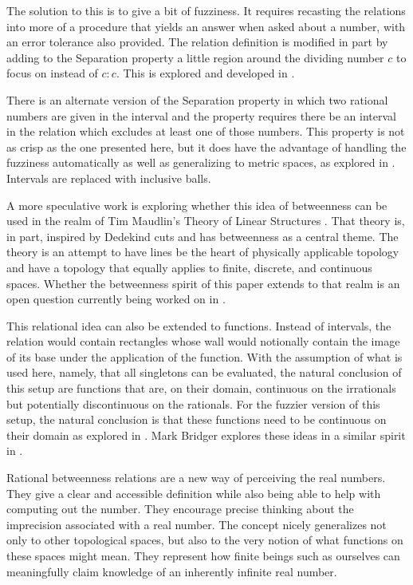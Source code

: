 \documentclass[12pt]{article}
\begin{document}
The solution to this is to give a bit of fuzziness. It requires recasting the relations into more of a procedure that yields an answer when asked about a number, with an error tolerance also provided. The relation definition is modified in part by adding to the Separation property a little region around the dividing number $c$ to focus on instead of $c:c$. This is explored and developed in \cite{taylor24oraclerbr}.

There is an alternate version of the Separation property in which two rational numbers are given in the interval and the property requires there be an interval in the relation which excludes at least one of those numbers. This property is not as crisp as the one presented here, but it does have the advantage of handling the fuzziness automatically as well as generalizing to metric spaces, as explored in \cite{taylor23metric}. Intervals are replaced with inclusive balls. 

A more speculative work is exploring whether this idea of betweenness can be used in the realm of Tim Maudlin's Theory of Linear Structures \cite{maudlin}. That theory is, in part, inspired by Dedekind cuts and has betweenness as a central theme. The theory is an attempt to have lines be the heart of physically applicable topology and have a topology that equally applies to finite, discrete, and continuous spaces. Whether the betweenness spirit of this paper extends to that realm is an open question currently being worked on in \cite{taylor23maudlin}.

This relational idea can also be extended to functions. Instead of intervals, the relation would contain rectangles whose wall would notionally contain the image of its base under the application of the function. With the assumption of what is used here, namely, that all singletons can be evaluated, the natural conclusion of this setup are functions that are, on their domain, continuous on the irrationals but potentially discontinuous on the rationals. For the fuzzier version of this setup, the natural conclusion is that these functions need to be continuous on their domain as explored in \cite{taylor23main}. Mark Bridger explores  these ideas in a similar spirit in \cite{bridger}.

Rational betweenness relations are a new way of perceiving the real numbers. They give a clear and accessible definition while also being able to help with computing out the number. They encourage precise thinking about the imprecision associated with a real number. The concept nicely generalizes not only to other topological spaces, but also to the very notion of what functions on these spaces might mean. They represent how finite beings such as ourselves can meaningfully claim knowledge of an inherently infinite real number. 


\medskip

\normalem %
\printbibliography
\end{document}
